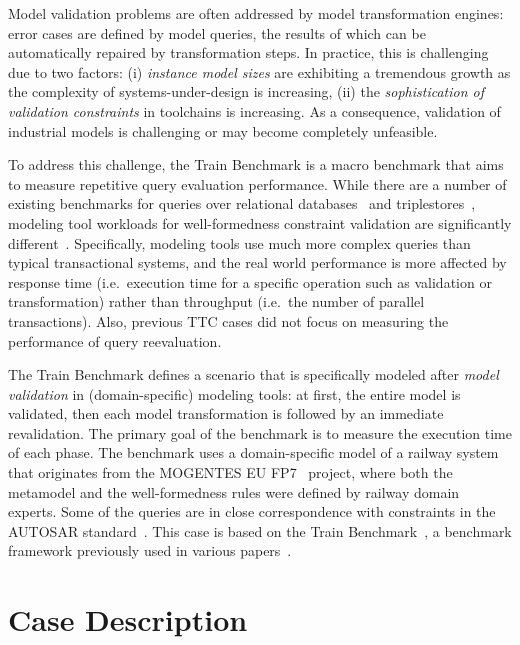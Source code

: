 \documentclass[submission,copyright,creativecommons]{eptcs}
\newcommand{\tb}{Train Benchmark\xspace}
\begin{document}
Model validation problems are often addressed by model transformation engines: error cases are defined by model queries, the results of which can be automatically repaired by transformation steps. In practice, this is challenging due to two factors: (i) \emph{instance model sizes} are exhibiting a tremendous growth as the complexity of systems-under-design is increasing, (ii) the \emph{sophistication of validation constraints} in toolchains is increasing. As a consequence, validation of industrial models is challenging or may become completely unfeasible.

To address this challenge, the \tb is a macro benchmark that aims to measure repetitive query evaluation performance. While there are a number of existing benchmarks for queries over relational databases~\cite{TPC-C, Wisconsin} and triplestores~\cite{BSBM, SP2Bench, DBpedia, LUBM}, modeling tool workloads for well-formedness constraint validation are significantly different~\cite{ase2013}. Specifically, modeling tools use much more complex queries than typical transactional systems, and the real world performance is more affected by response time (i.e.\ execution time for a specific operation such as validation or transformation) rather than throughput (i.e.\ the number of parallel transactions). Also, previous TTC cases did not focus on measuring the performance of query reevaluation.

The \tb defines a scenario that is specifically modeled after \emph{model validation} in (domain-specific) modeling tools: at first, the entire model is validated, then each model transformation is followed by an immediate revalidation. The primary goal of the benchmark is to measure the execution time of each phase. The benchmark uses a domain-specific model of a railway system that originates from the \mbox{MOGENTES} EU FP7~\cite{MOGENTES} project, where both the metamodel and the well-formedness rules were defined by railway domain experts. Some of the queries are in close correspondence with constraints in the AUTOSAR standard~\cite{AUTOSAR}. This case is based on the \tb~\cite{TrainBenchmarkTechReport}, a benchmark framework previously used in various papers~\cite{bigmde2013, ase2013, bigmde2014, models2014, scp2015}.

\section{Case Description}

\end{document}
